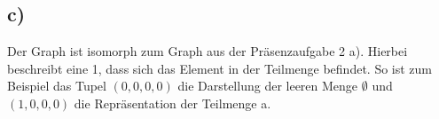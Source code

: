 \documentclass{article}
\begin{document}
	\subsection*{c)}

	Der Graph ist isomorph zum Graph aus der Präsenzaufgabe 2 a). Hierbei
	beschreibt eine 1, dass sich das Element in der Teilmenge befindet. So ist
	zum Beispiel das Tupel $(0, 0, 0, 0)$ die Darstellung der leeren Menge $\emptyset$ und
	$(1, 0, 0, 0)$ die Repräsentation der Teilmenge {a}.
\end{document}
